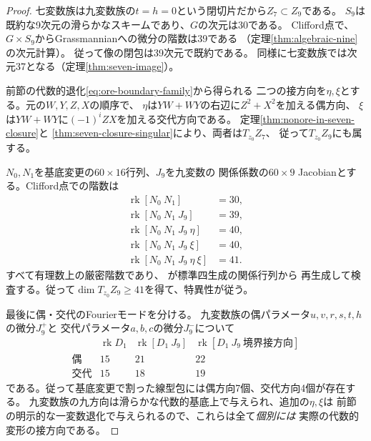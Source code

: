 \begin{proof}
七変数族は九変数族の$t=h=0$という閉切片だから$Z_7\subset Z_9$である。
$S_9$は既約な9次元の滑らかなスキームであり、$G$の次元は30である。
Clifford点で、$G\times S_9$からGrassmannianへの微分の階数は39である
（定理\ref{thm:algebraic-nine}の次元計算）。
従って像の閉包は39次元で既約である。
同様に七変数族では次元37となる（定理\ref{thm:seven-image}）。

前節の代数的退化\eqref{eq:ore-boundary-family}から得られる
二つの接方向を$\eta,\xi$とする。元の$W,Y,Z,X$の順序で、
$\eta$は$YW+WY$の右辺に$Z^2+X^2$を加える偶方向、
$\xi$は$YW+WY$に$(-1)^iZX$を加える交代方向である。
定理\ref{thm:nonore-in-seven-closure}と
\ref{thm:seven-closure-singular}により、両者は$T_{z_0}Z_7$、
従って$T_{z_0}Z_9$にも属する。

$N_0,N_1$を基底変更の$60\times16$行列、$J_9$を九変数の
関係係数の$60\times9$ Jacobianとする。Clifford点での階数は
\begin{equation}\label{eq:nine-closure-ranks}
\begin{aligned}
 \operatorname{rk}[N_0\ N_1]&=30,\\
 \operatorname{rk}[N_0\ N_1\ J_9]&=39,\\
 \operatorname{rk}[N_0\ N_1\ J_9\ \eta]&=40,\\
 \operatorname{rk}[N_0\ N_1\ J_9\ \xi]&=40,\\
 \operatorname{rk}[N_0\ N_1\ J_9\ \eta\ \xi]&=41.
\end{aligned}
\end{equation}
すべて有理数上の厳密階数であり、
が標準四生成の関係行列から
再生成して検査する。従って$\dim T_{z_0}Z_9\ge41$を得て、特異性が従う。

最後に偶・交代のFourierモードを分ける。
九変数族の偶パラメータ$u,v,r,s,t,h$の微分$J_9^{+}$と
交代パラメータ$a,b,c$の微分$J_9^{-}$について
\[
 \begin{array}{c|ccc}
 &\operatorname{rk}D_1&\operatorname{rk}[D_1\ J_9]&
 \operatorname{rk}[D_1\ J_9\ \text{境界接方向}]\\\hline
 \text{偶}&15&21&22\\
 \text{交代}&15&18&19
 \end{array}
\]
である。従って基底変更で割った線型包には偶方向7個、交代方向4個が存在する。
九変数族の九方向は滑らかな代数的基底上で与えられ、追加の$\eta,\xi$は
前節の明示的な一変数退化で与えられるので、これらは全て\emph{個別には}
実際の代数的変形の接方向である。
\end{proof}

